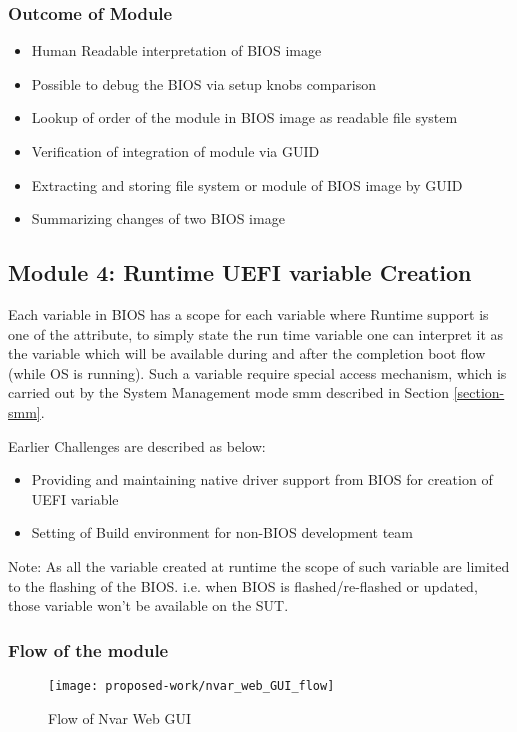 \subsubsection{Outcome of Module}
\begin{itemize}
	\item Human Readable interpretation of BIOS image
	\item Possible to debug the BIOS via setup knobs comparison
	\item Lookup of order of the module in BIOS image as readable file system 
	\item Verification of integration of module via GUID
	\item Extracting and storing file system or module of BIOS image by GUID
	\item Summarizing changes of two BIOS image
\end{itemize}



\subsection{Module 4: Runtime UEFI variable Creation}\label{module-runtime-uefi-variable-creation}
Each variable in BIOS has a scope for each variable where Runtime support is one of the attribute, to simply state the run time variable one can interpret it as the variable which will be available during and after the completion boot flow (while OS is running). Such a variable require special access mechanism, which is carried out by the System Management mode \gls{smm} described in Section \ref{section-smm}.

Earlier Challenges are described as below:
\begin{itemize}
	\item Providing and maintaining native driver support from BIOS for creation of UEFI variable
	\item Setting of Build environment for non-BIOS development team
\end{itemize} 

Note: As all the variable created at runtime the scope of such variable are limited to the flashing of the BIOS. i.e. when BIOS is flashed/re-flashed or updated, those variable won't be available on the SUT.

\subsubsection{Flow of the module}

\begin{figure}[!htbp]
	\centering
	\texttt{[image: proposed-work/nvar\_web\_GUI\_flow]}
	\caption{Flow of Nvar Web GUI}\label{fig:nvar_web_GUI_flow}
\end{figure}



